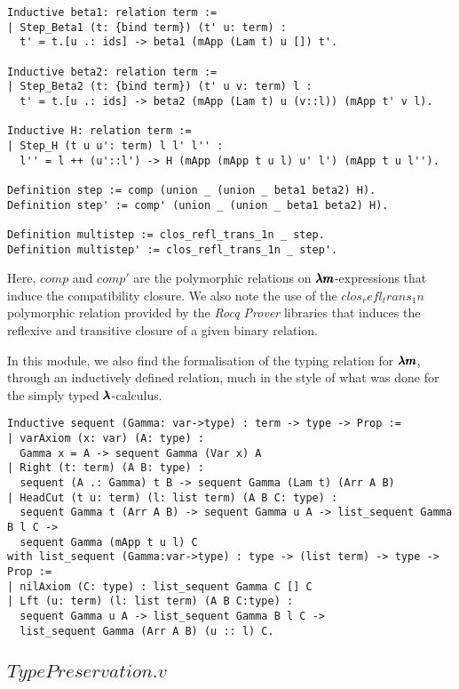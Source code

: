 \begin{lstlisting}[language=Coq]
Inductive beta1: relation term :=
| Step_Beta1 (t: {bind term}) (t' u: term) :
  t' = t.[u .: ids] -> beta1 (mApp (Lam t) u []) t'.

Inductive beta2: relation term :=
| Step_Beta2 (t: {bind term}) (t' u v: term) l :
  t' = t.[u .: ids] -> beta2 (mApp (Lam t) u (v::l)) (mApp t' v l).

Inductive H: relation term :=       
| Step_H (t u u': term) l l' l'' :
  l'' = l ++ (u'::l') -> H (mApp (mApp t u l) u' l') (mApp t u l'').

Definition step := comp (union _ (union _ beta1 beta2) H).
Definition step' := comp' (union _ (union _ beta1 beta2) H).

Definition multistep := clos_refl_trans_1n _ step.
Definition multistep' := clos_refl_trans_1n _ step'.
\end{lstlisting}

Here, \lst$comp$ and \lst$comp'$ are the polymorphic relations on $\pmb{\lambda m}$-expressions that induce the compatibility closure.
We also note the use of the \lst$clos_refl_trans_1n$ polymorphic relation provided by the \textit{Rocq Prover} libraries that induces the reflexive and transitive closure of a given binary relation.

In this module, we also find the formalisation of the typing relation for $\pmb{\lambda m}$, through an inductively defined relation, much in the style of what was done for the simply typed $\pmb{\lambda}$-calculus.
\begin{lstlisting}[language=Coq]
Inductive sequent (Gamma: var->type) : term -> type -> Prop := 
| varAxiom (x: var) (A: type) :
  Gamma x = A -> sequent Gamma (Var x) A
| Right (t: term) (A B: type) :
  sequent (A .: Gamma) t B -> sequent Gamma (Lam t) (Arr A B)
| HeadCut (t u: term) (l: list term) (A B C: type) :
  sequent Gamma t (Arr A B) -> sequent Gamma u A -> list_sequent Gamma B l C ->
  sequent Gamma (mApp t u l) C
with list_sequent (Gamma:var->type) : type -> (list term) -> type -> Prop :=
| nilAxiom (C: type) : list_sequent Gamma C [] C
| Lft (u: term) (l: list term) (A B C:type) :
  sequent Gamma u A -> list_sequent Gamma B l C ->
  list_sequent Gamma (Arr A B) (u :: l) C.
\end{lstlisting}

\subsection{\lst$TypePreservation.v$}

